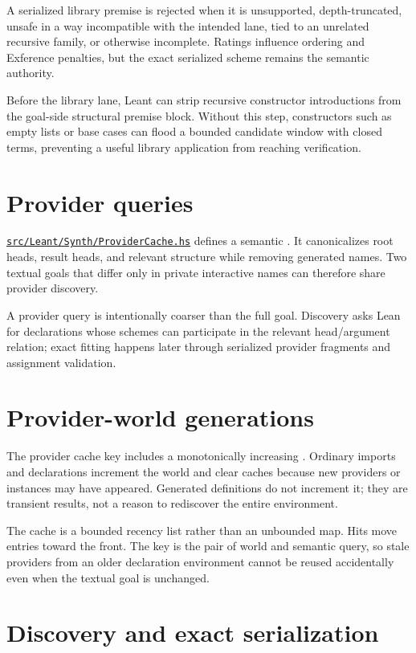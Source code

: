 \documentclass[10pt,letterpaper,oneside]{report}
\newcommand{\code}[1]{\texttt{\detokenize{#1}}}
\def\LeantBase{https://github.com/VladimirReshetnikov/Leant/blob/ada69d884480b93e74ee4b3daf77be38702ee07d/}
\newcommand{\lpath}[1]{\href{\LeantBase#1}{\nolinkurl{#1}}}
\begin{document}
A serialized library premise is rejected when it is unsupported, depth-truncated, unsafe in a way incompatible with the intended lane, tied to an unrelated recursive family, or otherwise incomplete. Ratings influence ordering and Exference penalties, but the exact serialized scheme remains the semantic authority.

Before the library lane, Leant can strip recursive constructor introductions from the goal-side structural premise block. Without this step, constructors such as empty lists or base cases can flood a bounded candidate window with closed terms, preventing a useful library application from reaching verification.

\section{Provider queries}

\lpath{src/Leant/Synth/ProviderCache.hs} defines a semantic \code{ProviderQuery}. It canonicalizes root heads, result heads, and relevant structure while removing generated \code{it} names. Two textual goals that differ only in private interactive names can therefore share provider discovery.

A provider query is intentionally coarser than the full goal. Discovery asks Lean for declarations whose schemes can participate in the relevant head/argument relation; exact fitting happens later through serialized provider fragments and assignment validation.

\section{Provider-world generations}

The provider cache key includes a monotonically increasing \code{ProviderWorld}. Ordinary imports and declarations increment the world and clear caches because new providers or instances may have appeared. Generated \code{it} definitions do not increment it; they are transient results, not a reason to rediscover the entire environment.

The cache is a bounded recency list rather than an unbounded map. Hits move entries toward the front. The key is the pair of world and semantic query, so stale providers from an older declaration environment cannot be reused accidentally even when the textual goal is unchanged.

\section{Discovery and exact serialization}
\end{document}
